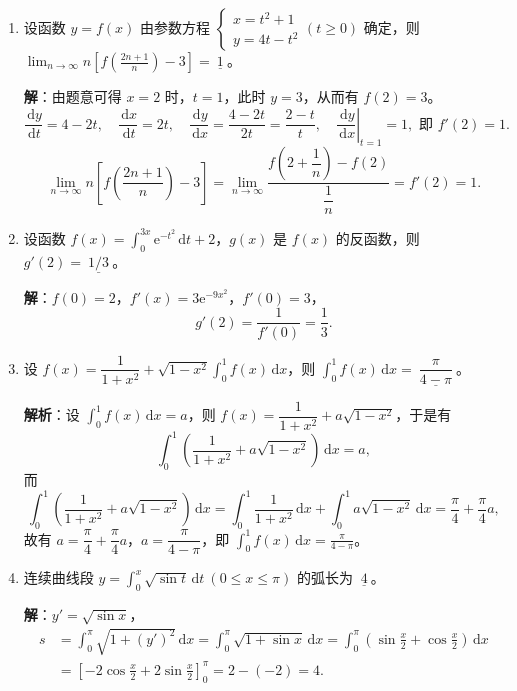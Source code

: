 \documentclass[a4paper,11pt]{ctexart}
\newcommand{\dd}{\,\mathrm{d}}
\newcommand{\e}{\mathrm{e}}
\begin{document}
\begin{enumerate}[label=\arabic*., start=7, leftmargin=2em, itemsep=0.85em, topsep=0.45em]
  \item 设函数 $y=f(x)$ 由参数方程 $\begin{cases}x=t^2+1\\ y=4t-t^2\end{cases}(t\ge 0)$ 确定，则 $\displaystyle\lim_{n\to\infty}n\left[f\!\left(\frac{2n+1}{n}\right)-3\right]=\underline{\ 1\ }$。

  \textbf{解}：由题意可得 $x=2$ 时，$t=1$，此时 $y=3$，从而有 $f(2)=3$。
  \[
    \frac{\dd y}{\dd t}=4-2t,\quad \frac{\dd x}{\dd t}=2t,\quad \frac{\dd y}{\dd x}=\frac{4-2t}{2t}=\frac{2-t}{t},\quad \left.\frac{\dd y}{\dd x}\right|_{t=1}=1,\text{ 即 }f'(2)=1.
  \]
  \[
    \lim_{n\to\infty}n\left[f\!\left(\frac{2n+1}{n}\right)-3\right]=\lim_{n\to\infty}\frac{f\!\left(2+\dfrac{1}{n}\right)-f(2)}{\dfrac{1}{n}}=f'(2)=1.
  \]

  \item 设函数 $f(x)=\displaystyle\int_0^{3x}\e^{-t^2}\dd t+2$，$g(x)$ 是 $f(x)$ 的反函数，则 $g'(2)=\underline{\ 1/3\ }$。

  \textbf{解}：$f(0)=2$，$f'(x)=3\e^{-9x^2}$，$f'(0)=3$，
  \[
    g'(2)=\frac{1}{f'(0)}=\frac{1}{3}.
  \]

  \item 设 $f(x)=\dfrac{1}{1+x^2}+\sqrt{1-x^2}\displaystyle\int_0^1 f(x)\dd x$，则 $\displaystyle\int_0^1 f(x)\dd x=\underline{\ \dfrac{\pi}{4-\pi}\ }$。

  \textbf{解析}：设 $\displaystyle\int_0^1 f(x)\dd x=a$，则 $f(x)=\dfrac{1}{1+x^2}+a\sqrt{1-x^2}$，于是有
  \[
    \int_0^1\left(\frac{1}{1+x^2}+a\sqrt{1-x^2}\right)\dd x=a,
  \]
  而
  \[
    \int_0^1\left(\frac{1}{1+x^2}+a\sqrt{1-x^2}\right)\dd x = \int_0^1\frac{1}{1+x^2}\dd x+\int_0^1 a\sqrt{1-x^2}\dd x = \frac{\pi}{4}+\frac{\pi}{4}a,
  \]
  故有 $a=\dfrac{\pi}{4}+\dfrac{\pi}{4}a$，$a=\dfrac{\pi}{4-\pi}$，即 $\displaystyle\int_0^1 f(x)\dd x=\frac{\pi}{4-\pi}$。

  \item 连续曲线段 $y=\displaystyle\int_0^x\sqrt{\sin t}\dd t\ (0\le x\le\pi)$ 的弧长为 $\underline{\ 4\ }$。

  \textbf{解}：$y'=\sqrt{\sin x}$，
  \begin{align*}
    s &= \int_0^\pi\sqrt{1+(y')^2}\dd x = \int_0^\pi\sqrt{1+\sin x}\dd x = \int_0^\pi\left(\sin\frac{x}{2}+\cos\frac{x}{2}\right)\dd x \\
      &= \left[-2\cos\frac{x}{2}+2\sin\frac{x}{2}\right]_0^\pi = 2-(-2) = 4.
  \end{align*}
\end{enumerate}
\end{document}
